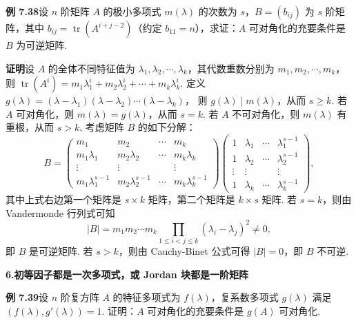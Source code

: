 \documentclass[UTF8, 12pt, fontset=fandol, oneside]{ctexart}
\begin{document}
\noindent\textbf{例 7.38}\quad 设 $n$ 阶矩阵 $A$ 的极小多项式 $m(\lambda)$ 的次数为 $s$，$B=(b_{ij})$ 为 $s$ 阶矩阵，其中 $b_{ij}=\operatorname{tr}(A^{i+j-2})$（约定 $b_{11}=n$），求证：$A$ 可对角化的充要条件是 $B$ 为可逆矩阵.

\noindent\textbf{证明}\quad 设 $A$ 的全体不同特征值为 $\lambda_1,\lambda_2,\cdots,\lambda_k$，其代数重数分别为 $m_1,m_2,\cdots,m_k$，则 $\operatorname{tr}(A^i)=m_1\lambda_1^i+m_2\lambda_2^i+\cdots+m_k\lambda_k^i$. 定义 $g(\lambda)=(\lambda-\lambda_1)(\lambda-\lambda_2)\cdots(\lambda-\lambda_k)$，
则 $g(\lambda)\mid m(\lambda)$，从而 $s\ge k$. 若 $A$ 可对角化，则 $m(\lambda)=g(\lambda)$，从而 $s=k$. 若 $A$ 不可对角化，则 $m(\lambda)$ 有重根，从而 $s>k$. 考虑矩阵 $B$ 的如下分解：
\[
B=
\left(\begin{array}{cccc}
m_1 & m_2 & \cdots & m_k\\
m_1\lambda_1 & m_2\lambda_2 & \cdots & m_k\lambda_k\\
\vdots & \vdots &        & \vdots\\
m_1\lambda_1^{s-1} & m_2\lambda_2^{s-1} & \cdots & m_k\lambda_k^{s-1}
\end{array}\right)
\left(\begin{array}{cccc}
1 & \lambda_1 & \cdots & \lambda_1^{s-1}\\
1 & \lambda_2 & \cdots & \lambda_2^{s-1}\\
\vdots & \vdots &        & \vdots\\
1 & \lambda_k & \cdots & \lambda_k^{s-1}
\end{array}\right),
\]
其中上式右边第一个矩阵是 $s\times k$ 矩阵，第二个矩阵是 $k\times s$ 矩阵. 若 $s=k$，则由 Vandermonde 行列式可知
\[
|B|=m_1m_2\cdots m_k\prod_{1\le i<j\le k}(\lambda_i-\lambda_j)^2\ne 0,
\]
即 $B$ 是可逆矩阵. 若 $s>k$，则由 Cauchy-Binet 公式可得 $|B|=0$，即 $B$ 不可逆.

\noindent\textbf{6.\quad 初等因子都是一次多项式，或 Jordan 块都是一阶矩阵}

\noindent\textbf{例 7.39}\quad 设 $n$ 阶复方阵 $A$ 的特征多项式为 $f(\lambda)$，复系数多项式 $g(\lambda)$ 满足 $(f(\lambda),g'(\lambda))=1$. 证明：$A$ 可对角化的充要条件是 $g(A)$ 可对角化.
\end{document}
